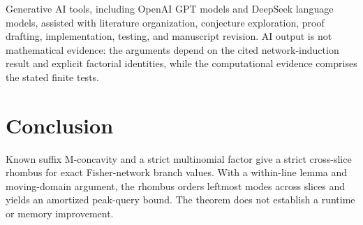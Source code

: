 \documentclass[10pt]{article}
\begin{document}
Generative AI tools, including OpenAI GPT models and DeepSeek language models,
assisted with literature organization, conjecture exploration, proof drafting,
implementation, testing, and manuscript revision. AI output
is not mathematical evidence: the arguments depend on the cited
network-induction result and explicit factorial identities, while the
computational evidence comprises the stated finite tests.

\section{Conclusion}

Known suffix M-concavity and a strict multinomial factor give a strict
cross-slice rhombus for exact Fisher-network branch values. With a
within-line lemma and moving-domain argument, the rhombus orders leftmost
modes across slices and yields an amortized peak-query bound. The theorem
does not establish a runtime or memory improvement.

\begingroup
\footnotesize


\endgroup
\end{document}
